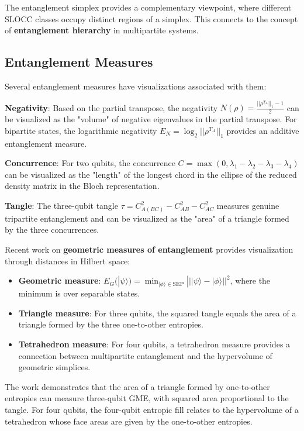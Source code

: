 \documentclass[%
 amsmath,amssymb,
 aps,
rmp,
]{revtex4-2}
\begin{document}
The entanglement simplex provides a complementary viewpoint, where different SLOCC classes occupy distinct regions of a simplex. This connects to the concept of \textbf{entanglement hierarchy} in multipartite systems.





\subsection{Entanglement Measures}
\label{sec:measures}

Several entanglement measures have visualizations associated with them:

\textbf{Negativity}: Based on the partial transpose, the negativity $N(\rho) = \frac{||\rho^{T_A}||_1 - 1}{2}$ can be visualized as the "volume" of negative eigenvalues in the partial transpose. For bipartite states, the logarithmic negativity $E_N = \log_2 ||\rho^{T_A}||_1$ provides an additive entanglement measure.

\textbf{Concurrence}: For two qubits, the concurrence $C = \max(0, \lambda_1 - \lambda_2 - \lambda_3 - \lambda_4)$ can be visualized as the "length" of the longest chord in the ellipse of the reduced density matrix in the Bloch representation.

\textbf{Tangle}: The three-qubit tangle $\tau = C_{A(BC)}^2 - C_{AB}^2 - C_{AC}^2$ measures genuine tripartite entanglement and can be visualized as the "area" of a triangle formed by the three concurrences.

Recent work on \textbf{geometric measures of entanglement} provides visualization through distances in Hilbert space:
\begin{itemize}
	\item \textbf{Geometric measure}: $E_G(|\psi\rangle) = \min_{|\phi\rangle \in \text{SEP}} |||\psi\rangle - |\phi\rangle||^2$, where the minimum is over separable states.
	\item \textbf{Triangle measure}: For three qubits, the squared tangle equals the area of a triangle formed by the three one-to-other entropies.
	\item \textbf{Tetrahedron measure}: For four qubits, a tetrahedron measure provides a connection between multipartite entanglement and the hypervolume of geometric simplices.
\end{itemize}

The work demonstrates that the area of a triangle formed by one-to-other entropies can measure three-qubit GME, with squared area proportional to the tangle. For four qubits, the four-qubit entropic fill relates to the hypervolume of a tetrahedron whose face areas are given by the one-to-other entropies.
\end{document}
